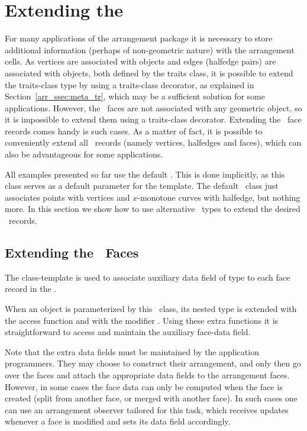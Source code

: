 \section{Extending the \dcel\label{arr_sec:ex_dcel}}

For many applications of the arrangement package it is necessary to
store additional information (perhaps of non-geometric nature) with
the arrangement cells. As vertices are associated with 
objects and edges (halfedge pairs) are associated with
 objects, both defined by the traits class,
it is possible to extend the traits-class type by using a traits-class
decorator, as explained in Section~\ref{arr_ssec:meta_tr}, which may
be a sufficient solution for some applications.
However, the \dcel\ faces are not associated with any geometric object, 
so it is impossible to extend them using a traits-class decorator. 
Extending the \dcel\ face records comes handy is such cases. As a matter
of fact, it is possible to conveniently extend all \dcel\ records
(namely vertices, halfedges and faces), which can also be advantageous
for some applications.

All examples presented so far use the default . 
This is done implicitly, as this class serves as a default parameter for 
the  template. The default \dcel\ class just associates 
points with vertices and $x$-monotone curves with halfedge, but nothing more. 
In this section we show how to use alternative \dcel\ types to extend the 
desired \dcel\ records.

\subsection{Extending the \dcel\ Faces\label{arr_ssec:ex_dcel_face}}

The  class-template
is used to associate auxiliary data field of type  to
each face record in the \dcel.

When an  object is parameterized by this 
\dcel\ class, its nested  type is extended with the access function
 and with the modifier . Using these extra
functions it is straightforward to access and maintain the auxiliary
face-data field.

Note that the extra data fields must be maintained by the application
programmers. They may choose to construct their arrangement, and
only then go over the faces and attach the appropriate data fields to
the arrangement faces. However, in some cases the face data can only
be computed when the face is created (split from another face, or merged
with another face). In such cases one can use an arrangement observer
tailored for this task, which receives updates whenever a face is
modified and sets its data field accordingly.

